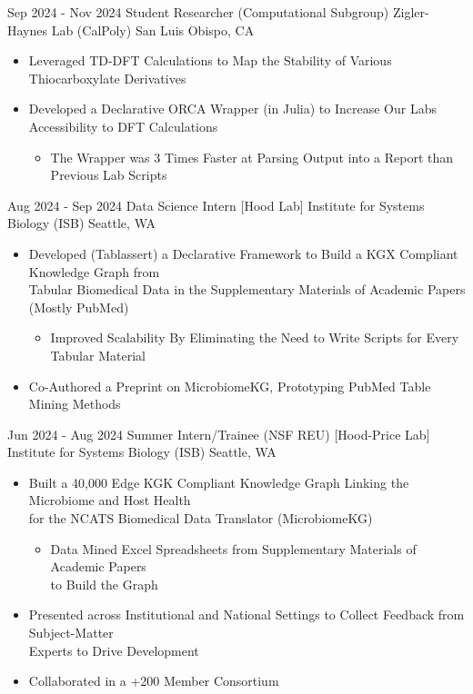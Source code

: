 \documentclass[11pt]{moderncv}
\begin{document}
\cventry
{Sep 2024 - Nov 2024}
{Student Researcher (Computational Subgroup)}
{Zigler-Haynes Lab (CalPoly)}
{San Luis Obispo, CA}
{}
{%
\begin{itemize}
\item Leveraged TD-DFT Calculations to Map the Stability of Various Thiocarboxylate Derivatives
\item Developed a Declarative ORCA Wrapper (in Julia) to Increase Our Labs Accessibility to DFT Calculations
  \begin{itemize}
  \item The Wrapper was 3 Times Faster at Parsing Output into a Report than Previous Lab Scripts
  \end{itemize}
\end{itemize}
}
\cventry
{Aug 2024 - Sep 2024}
{Data Science Intern [Hood Lab]}
{Institute for Systems Biology (ISB)}
{Seattle, WA}
{}
{%
\begin{itemize}
\item Developed (Tablassert) a Declarative Framework to Build a KGX Compliant Knowledge Graph from
      \\ Tabular Biomedical Data in the Supplementary Materials of Academic Papers (Mostly PubMed)
  \begin{itemize}
  \item Improved Scalability By Eliminating the Need to Write Scripts for Every Tabular Material
  \end{itemize}
\item Co-Authored a Preprint on MicrobiomeKG, Prototyping PubMed Table Mining Methods
\end{itemize}
}
\cventry
{Jun 2024 - Aug 2024}
{Summer Intern/Trainee (NSF REU) [Hood-Price Lab]}
{Institute for Systems Biology (ISB)}
{Seattle, WA}
{}
{%
\begin{itemize}
\item Built a 40,000 Edge KGK Compliant Knowledge Graph Linking the Microbiome and Host Health
      \\ for the NCATS Biomedical Data Translator (MicrobiomeKG)
  \begin{itemize}
  \item Data Mined Excel Spreadsheets from Supplementary Materials of Academic Papers
      \\ to Build the Graph
  \end{itemize}
\item Presented across Institutional and National Settings to Collect Feedback from Subject-Matter
      \\ Experts to Drive Development
\item Collaborated in a +200 Member Consortium
\end{itemize}
}
\end{document}
